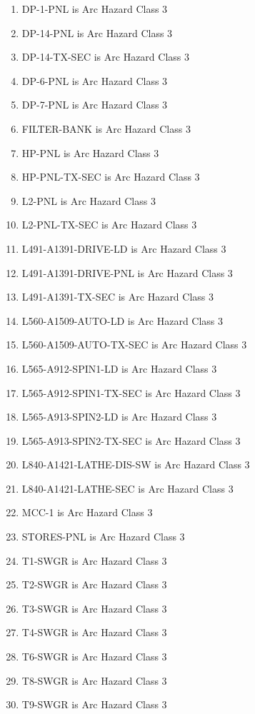 \begin{enumerate}
\item DP-1-PNL is Arc Hazard Class 3
\item DP-14-PNL is Arc Hazard Class 3
\item DP-14-TX-SEC is Arc Hazard Class 3
\item DP-6-PNL is Arc Hazard Class 3
\item DP-7-PNL is Arc Hazard Class 3
\item FILTER-BANK is Arc Hazard Class 3
\item HP-PNL is Arc Hazard Class 3
\item HP-PNL-TX-SEC is Arc Hazard Class 3
\item L2-PNL is Arc Hazard Class 3
\item L2-PNL-TX-SEC is Arc Hazard Class 3
\item L491-A1391-DRIVE-LD is Arc Hazard Class 3
\item L491-A1391-DRIVE-PNL is Arc Hazard Class 3
\item L491-A1391-TX-SEC is Arc Hazard Class 3
\item L560-A1509-AUTO-LD is Arc Hazard Class 3
\item L560-A1509-AUTO-TX-SEC is Arc Hazard Class 3
\item L565-A912-SPIN1-LD is Arc Hazard Class 3
\item L565-A912-SPIN1-TX-SEC is Arc Hazard Class 3
\item L565-A913-SPIN2-LD is Arc Hazard Class 3
\item L565-A913-SPIN2-TX-SEC is Arc Hazard Class 3
\item L840-A1421-LATHE-DIS-SW is Arc Hazard Class 3
\item L840-A1421-LATHE-SEC is Arc Hazard Class 3
\item MCC-1 is Arc Hazard Class 3
\item STORES-PNL is Arc Hazard Class 3
\item T1-SWGR is Arc Hazard Class 3
\item T2-SWGR is Arc Hazard Class 3
\item T3-SWGR is Arc Hazard Class 3
\item T4-SWGR is Arc Hazard Class 3
\item T6-SWGR is Arc Hazard Class 3
\item T8-SWGR is Arc Hazard Class 3
\item T9-SWGR is Arc Hazard Class 3

\end{enumerate}

\pagebreak

